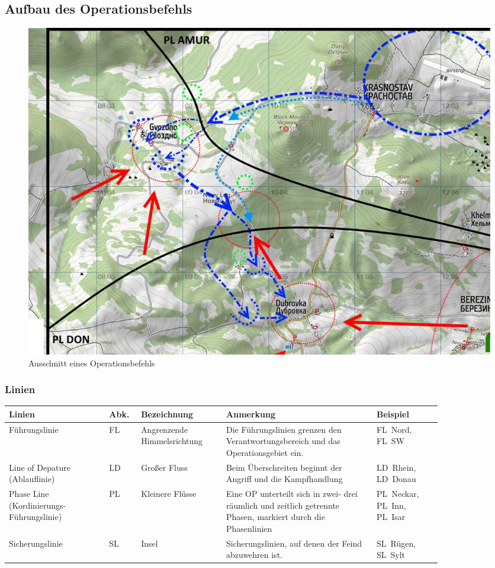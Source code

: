 \pagebreak
\subsection{Aufbau des Operationsbefehls}
\label{OPbef}

\begin{figure}[h]
	\centering
	\includegraphics[width=\textwidth]{../img/advanced/kartenarbeit/OP-Befehl}
	\caption[Ausschnitt eines Operationsbefehls]{Ausschnitt eines Operationsbefehls\footnotemark}
	\label{fig:OP-Befehl}
\end{figure}

\subsubsection{Linien}
\begin{longtable}{P{0.2\linewidth}P{0.05\linewidth}P{0.17\linewidth}P{0.3\linewidth}P{0.13\linewidth}} 	
	\toprule
	Linien & Abk. & Bezeichnung & Anmerkung & Beispiel\\ 
	\midrule
	Führungslinie & FL & Angrenzende Himmelsrichtung & Die Führungslinien grenzen  den Verantwortungsbereich und das Operationsgebiet ein. & FL~Nord, FL~SW \\ 
	Line of Depature (Ablauflinie) & LD & Großer Fluss & Beim Überschreiten beginnt der Angriff und die Kampfhandlung & LD~Rhein, LD~Donau\\ 
	Phase Line (Kordinierungs-Führungslinie) & PL & Kleinere Flüsse & Eine OP unterteilt sich in zwei- drei räumlich und zeitlich getrennte Phasen, markiert durch die Phasenlinien & PL~Neckar, PL~Inn, PL~Isar\\ 
	Sicherungslinie & SL & Insel & Sicherungslinien, auf denen der Feind abzuwehren ist. & SL~Rügen, SL~Sylt\\ 
	\bottomrule
\end{longtable}


